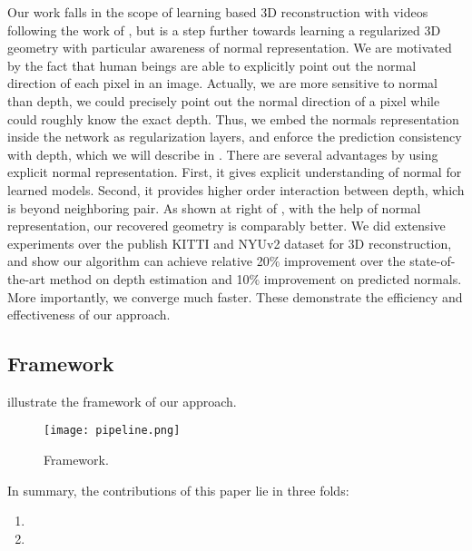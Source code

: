 Our work falls in the scope of learning based 3D reconstruction with videos following the work of \cite{zhou2017unsupervised}, but is a step further towards learning a regularized 3D geometry with particular awareness of normal representation. 
We are motivated by the fact that human beings are able to explicitly point out the normal direction of each pixel in an image. Actually, we are more sensitive to normal than depth, \eg we could precisely point out the normal direction of a pixel while could roughly know the exact depth. 
Thus, we embed the normals representation inside the network as regularization layers, and enforce the prediction consistency with depth, which we will describe in .
There are several advantages by using explicit normal representation. First, it gives explicit understanding of normal for learned models.  Second, it provides higher order interaction between depth, which is beyond neighboring pair. 
As shown at right of , with the help of normal representation, our recovered geometry is comparably better. We did extensive experiments over the publish KITTI and NYUv2 dataset for 3D reconstruction, and show our algorithm can achieve relative 20$\%$ improvement over the state-of-the-art method on depth estimation and 10$\%$ improvement on predicted normals. More importantly, we converge much faster. These demonstrate the efficiency and effectiveness of our approach.



\subsection{Framework}
 illustrate the framework of our approach. 



\begin{figure}
\centering
\texttt{[image: pipeline.png]}
\caption{Framework.}
\label{fig:pipeline}
\end{figure}

In summary, the contributions of this paper lie in three folds:

\begin{enumerate}
    \item 
    \item 

\end{enumerate}

